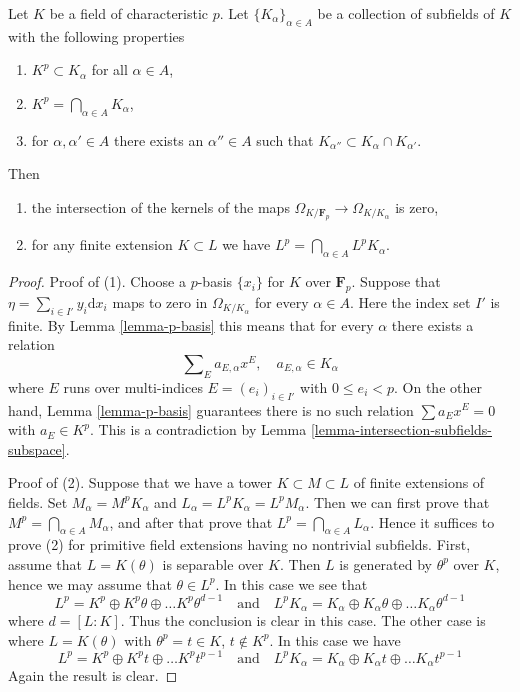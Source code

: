 \begin{lemma}
\label{lemma-intersection-subfields}
Let $K$ be a field of characteristic $p$. Let $\{K_\alpha\}_{\alpha \in A}$
be a collection of subfields of $K$ with the following properties
\begin{enumerate}
\item $K^p \subset K_\alpha$ for all $\alpha \in A$,
\item $K^p = \bigcap_{\alpha \in A} K_\alpha$,
\item for $\alpha, \alpha' \in A$ there exists an $\alpha'' \in A$
such that $K_{\alpha''} \subset K_\alpha \cap K_{\alpha'}$.
\end{enumerate}
Then
\begin{enumerate}
\item the intersection of the kernels of the maps
$\Omega_{K/\mathbf{F}_p} \to \Omega_{K/K_\alpha}$ is zero,
\item for any finite extension $K \subset L$ we have
$L^p = \bigcap_{\alpha \in A} L^pK_\alpha$.
\end{enumerate}
\end{lemma}

\begin{proof}
Proof of (1).
Choose a $p$-basis $\{x_i\}$ for $K$ over $\mathbf{F}_p$.
Suppose that $\eta = \sum_{i \in I'} y_i \text{d}x_i$ maps to zero in
$\Omega_{K/K_\alpha}$ for every $\alpha \in A$. Here the index set
$I'$ is finite. By Lemma \ref{lemma-p-basis}
this means that for every $\alpha$ there exists a relation
$$
\sum\nolimits_E a_{E, \alpha} x^E,\quad a_{E, \alpha} \in K_\alpha
$$
where $E$ runs over multi-indices $E = (e_i)_{i \in I'}$ with
$0 \leq e_i < p$. On the other hand, Lemma \ref{lemma-p-basis}
guarantees there is no such relation $\sum a_E x^E = 0$ with
$a_E \in K^p$. This is a contradiction by
Lemma \ref{lemma-intersection-subfields-subspace}.

\medskip\noindent
Proof of (2). Suppose that we have a tower $K \subset M \subset L$
of finite extensions of fields. Set $M_\alpha = M^p K_\alpha$
and $L_\alpha = L^p K_\alpha = L^p M_\alpha$. Then we can first prove that
$M^p = \bigcap_{\alpha \in A} M_\alpha$, and after that prove
that $L^p = \bigcap_{\alpha \in A} L_\alpha$. Hence it suffices to
prove (2) for primitive field extensions having no nontrivial subfields.
First, assume that $L = K(\theta)$ is separable over $K$. Then
$L$ is generated by $\theta^p$ over $K$, hence we may assume that
$\theta \in L^p$. In this case we see that
$$
L^p = K^p \oplus K^p\theta \oplus \ldots K^p\theta^{d - 1}
\quad\text{and}\quad
L^pK_\alpha =
K_\alpha \oplus K_\alpha \theta \oplus \ldots K_\alpha\theta^{d - 1}
$$
where $d = [L : K]$. Thus the conclusion is clear in this case. The other
case is where $L = K(\theta)$ with $\theta^p = t \in K$, $t \not \in K^p$.
In this case we have
$$
L^p = K^p \oplus K^pt \oplus \ldots K^pt^{p - 1}
\quad\text{and}\quad
L^pK_\alpha =
K_\alpha \oplus K_\alpha t \oplus \ldots K_\alpha t^{p - 1}
$$
Again the result is clear.
\end{proof}

